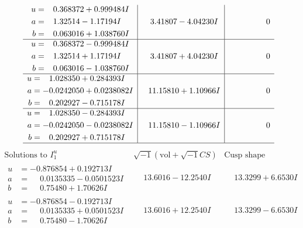 \documentclass[1p]{elsarticle_modified}
\theoremstyle{definition}
\newcommand{\I}{\sqrt{-1}}
\begin{document}
$$\begin{array}{c|c|c}
\begin{aligned}
u &= \phantom{-}0.368372 + 0.999484 I \\
a &= \phantom{-}1.32514 - 1.17194 I \\
b &= \phantom{-}0.063016 + 1.038760 I\end{aligned}
 & \phantom{-}3.41807 - 4.04230 I & \phantom{-0.000000 } 0 \\ \hline\begin{aligned}
u &= \phantom{-}0.368372 - 0.999484 I \\
a &= \phantom{-}1.32514 + 1.17194 I \\
b &= \phantom{-}0.063016 - 1.038760 I\end{aligned}
 & \phantom{-}3.41807 + 4.04230 I & \phantom{-0.000000 } 0 \\ \hline\begin{aligned}
u &= \phantom{-}1.028350 + 0.284393 I \\
a &= -0.0242050 + 0.0238082 I \\
b &= \phantom{-}0.202927 - 0.715178 I\end{aligned}
 & \phantom{-}11.15810 + 1.10966 I & \phantom{-0.000000 } 0 \\ \hline\begin{aligned}
u &= \phantom{-}1.028350 - 0.284393 I \\
a &= -0.0242050 - 0.0238082 I \\
b &= \phantom{-}0.202927 + 0.715178 I\end{aligned}
 & \phantom{-}11.15810 - 1.10966 I & \phantom{-0.000000 } 0\\
 \hline 
 \end{array}$$\newpage$$\begin{array}{c|c|c}  
\text{Solutions to }I^u_{1}& \I (\text{vol} + \sqrt{-1}CS) & \text{Cusp shape}\\
 \hline 
\begin{aligned}
u &= -0.876854 + 0.192713 I \\
a &= \phantom{-}0.0135335 - 0.0501523 I \\
b &= \phantom{-}0.75480 + 1.70626 I\end{aligned}
 & \phantom{-}13.6016 - 12.2540 I & \phantom{-}13.3299 + 6.6530 I \\ \hline\begin{aligned}
u &= -0.876854 - 0.192713 I \\
a &= \phantom{-}0.0135335 + 0.0501523 I \\
b &= \phantom{-}0.75480 - 1.70626 I\end{aligned}
 & \phantom{-}13.6016 + 12.2540 I & \phantom{-}13.3299 - 6.6530 I \\ \hline\begin{aligned}

\end{aligned}
\end{array}$$
\end{document}
